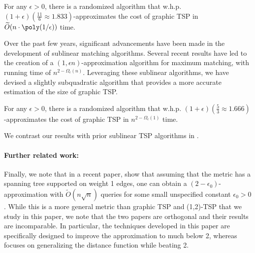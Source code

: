 \begin{graytbox}
\begin{result}\label{res:graphicTSP}
    For any $\epsilon > 0$, there is a randomized algorithm that w.h.p. $(1+\epsilon)(\frac{11}{6} \approx 1.833)$-approximates the cost of graphic TSP in $\widetilde{O}(n \cdot \poly(1/\epsilon))$ time.
\end{result}
\end{graytbox}


Over the past few years, significant advancements have been made in the development of sublinear matching algorithms. Several recent results \cite{BehnezhadRR23focs, behnezhadroghanirubinstein2022,brrstoc24, BehnezhadRRS-ArXiv22, bhattacharya2023dynamic, sayanSublinear2022} have led to the creation of a $(1, \epsilon n)$-approximation algorithm for maximum matching, with running time of $n^{2-\Omega_{\epsilon}(n)}$. Leveraging these sublinear algorithms, we have devised a slightly subquadratic algorithm that provides a more accurate estimation of the size of graphic TSP.


\begin{graytbox}
\begin{result}\label{res:graphicTSP2}
    For any $\epsilon > 0$, there is a randomized algorithm that w.h.p. $(1+\epsilon)(\frac{5}{3} \approx 1.666)$-approximates the cost of graphic TSP in $n^{2-\Omega_{\epsilon}(1)}$ time.
\end{result}
\end{graytbox}

We contrast our results with prior sublinear TSP algorithms in .


\paragraph{Further related work:} Finally, we note that in a recent paper, \citet*{ChenMetric-Arxiv22} show that assuming that the metric has a spanning tree supported on weight 1 edges, one can obtain a $(2-\epsilon_0)$-approximation with $\widetilde{O}(n\sqrt{n})$ queries for some small unspecified constant $\epsilon_0 > 0$. While this is a more general metric than graphic TSP and (1,2)-TSP that we study in this paper, we note that the two papers are orthogonal and their results are incomparable. In particular, the techniques developed in this paper are specifically designed to improve the approximation to much below 2, whereas \cite{ChenMetric-Arxiv22} focuses on generalizing the distance function while beating 2.



